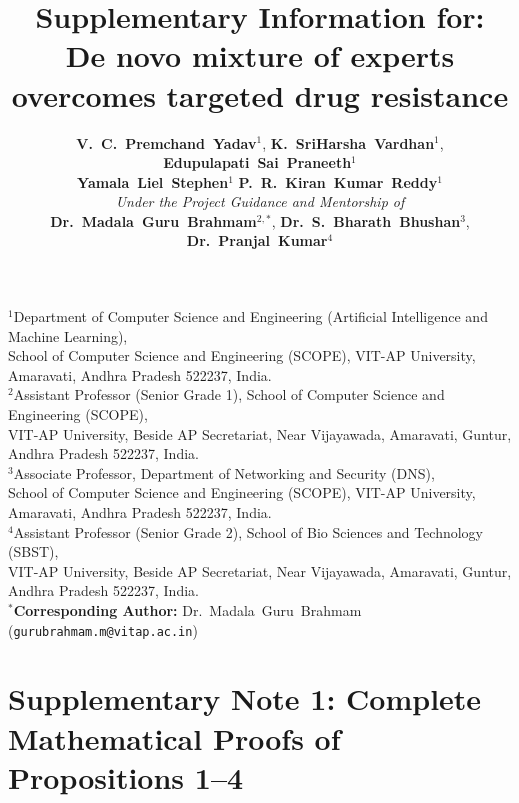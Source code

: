 \documentclass[11pt,a4paper]{article}
\title{\textbf{Supplementary Information for:\\De novo mixture of experts overcomes targeted drug resistance}}
\author{
    \textbf{V.~C.~Premchand~Yadav}$^{1}$,\quad
    \textbf{K.~SriHarsha~Vardhan}$^{1}$,\quad
    \textbf{Edupulapati~Sai~Praneeth}$^{1}$\\[0.35em]
    \textbf{Yamala~Liel~Stephen}$^{1}$\quad\text{and}\quad
    \textbf{P.~R.~Kiran~Kumar~Reddy}$^{1}$\\[0.85em]
    \large\textit{Under the Project Guidance and Mentorship of}\\[0.45em]
    \textbf{Dr.~Madala~Guru~Brahmam}$^{2,*}$,\quad
    \textbf{Dr.~S.~Bharath~Bhushan}$^{3}$,\quad\text{and}\quad
    \textbf{Dr.~Pranjal~Kumar}$^{4}$
}
\date{}
\begin{document}
\maketitle

\begin{center}
\small
$^{1}$Department of Computer Science and Engineering (Artificial Intelligence and Machine Learning),\\
School of Computer Science and Engineering (SCOPE), VIT-AP University, Amaravati, Andhra Pradesh 522237, India.\\[0.35em]
$^{2}$Assistant Professor (Senior Grade 1), School of Computer Science and Engineering (SCOPE),\\
VIT-AP University, Beside AP Secretariat, Near Vijayawada, Amaravati, Guntur, Andhra Pradesh 522237, India.\\[0.35em]
$^{3}$Associate Professor, Department of Networking and Security (DNS),\\
School of Computer Science and Engineering (SCOPE), VIT-AP University, Amaravati, Andhra Pradesh 522237, India.\\[0.35em]
$^{4}$Assistant Professor (Senior Grade 2), School of Bio Sciences and Technology (SBST),\\
VIT-AP University, Beside AP Secretariat, Near Vijayawada, Amaravati, Guntur, Andhra Pradesh 522237, India.\\[0.6em]
$^{*}$\textbf{Corresponding Author:} Dr.~Madala~Guru~Brahmam (\texttt{gurubrahmam.m@vitap.ac.in})
\end{center}

\vspace{1em}

\tableofcontents

\newpage

\section*{Supplementary Note 1: Complete Mathematical Proofs of Propositions 1--4}
\end{document}
